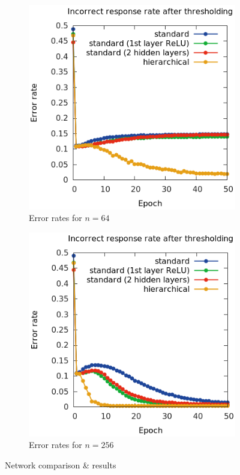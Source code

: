 \documentclass[10pt]{article}
\begin{document}
\begin{figure}[H]
\begin{subfigure}[c]{0.3\textwidth}
	\includegraphics[width=\textwidth]{figures/n64figure.png}
	\caption{Error rates for $n = 64$}
	\label{n64figure}
    \end{subfigure}
    \begin{subfigure}[c]{0.3\textwidth}
	\centering
	\includegraphics[width=\textwidth]{figures/n256figure.png}
	\caption{Error rates for $n = 256$}
	\label{n256figure}
    \end{subfigure}
    \caption{Network comparison \& results}
\end{figure}
\end{document}
